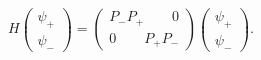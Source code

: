 \begin{equation}
\label{8}H\left( 
\begin{array}{c}
\psi _{+} \\ 
\psi _{-} 
\end{array}
\right) =\left( 
\begin{array}{c}
P_{-}P_{+}\qquad 0 \\ 
0\qquad P_{+}P_{-} 
\end{array}
\right) \left( 
\begin{array}{c}
\psi _{+} \\ 
\psi _{-} 
\end{array}
\right) . 
\end{equation}

